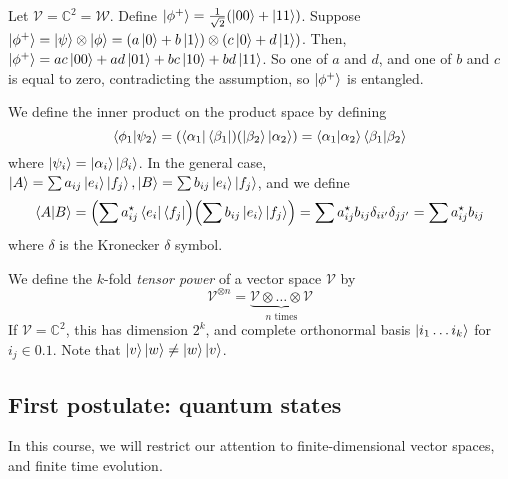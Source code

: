 Let \( \mathcal V = \mathbb C^2 = \mathcal W \).
Define \( \ket{\phi^+} = \frac{1}{\sqrt{2}} \qty(\ket{00} + \ket{11}) \).
Suppose \( \ket{\phi^+} = \ket{\psi}\otimes\ket{\phi} = (a\ket{0} + b\ket{1}) \otimes (c\ket{0} + d\ket{1}) \).
Then, \( \ket{\phi^+} = ac \ket{00} + ad \ket{01} + bc \ket{10} + bd \ket{11} \).
So one of \( a \) and \( d \), and one of \( b \) and \( c \) is equal to zero, contradicting the assumption, so \( \ket{\phi^+} \) is entangled.

We define the inner product on the product space by defining
\[ \ip{\phi_1}{\psi_2} = \qty(\bra{\alpha_1} \bra{\beta_1})\qty(\ket{\beta_2} \ket{\alpha_2}) = \ip{\alpha_1}{\alpha_2} \ip{\beta_1}{\beta_2} \]
where \( \ket{\psi_i} = \ket{\alpha_i}\ket{\beta_i} \).
In the general case, \( \ket{A} = \sum a_{ij} \ket{e_i}\ket{f_j}, \ket{B} = \sum b_{ij} \ket{e_i}\ket{f_j} \), and we define
\[ \ip{A}{B} = \qty(\sum a_{ij}^\star \bra{e_i} \bra{f_j}) \qty(\sum b_{ij} \ket{e_i} \ket{f_j}) = \sum a_{ij}^\star b_{ij} \delta_{ii'}\delta_{jj'} = \sum a_{ij}^\star b_{ij} \]
where \( \delta \) is the Kronecker \( \delta \) symbol.

We define the \( k \)-fold \emph{tensor power} of a vector space \( \mathcal V \) by
\[ \mathcal V^{\otimes n} = \underbrace{\mathcal V \otimes \dots \otimes \mathcal V}_{n \text{ times}} \]
If \( \mathcal V = \mathbb C^2 \), this has dimension \( 2^k \), and complete orthonormal basis \( \ket{i_1 \dots i_k} \) for \( i_j \in \qty{0,1} \).
Note that \( \ket{v}\ket{w} \neq \ket{w}\ket{v} \).

\subsection{First postulate: quantum states}
In this course, we will restrict our attention to finite-dimensional vector spaces, and finite time evolution.

